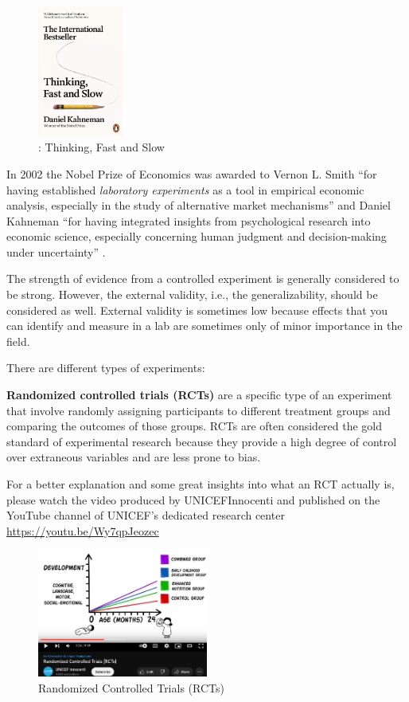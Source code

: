 \documentclass[
  12pt,
  oneside]{book}
\theoremstyle{definition}
\theoremstyle{definition}
\theoremstyle{definition}
\theoremstyle{definition}
\theoremstyle{remark}
\begin{document}
\begin{figure}
\centering
\includegraphics[width=0.25\textwidth,height=\textheight]{fig/tfts.jpg}
\caption{\label{fig:dkahnemann2} \citet{Kahneman2011Thinking}: Thinking, Fast and Slow}
\end{figure}

In 2002 the Nobel Prize of Economics was awarded to Vernon L. Smith ``for having established \emph{laboratory experiments} as a tool in empirical economic analysis, especially in the study of alternative market mechanisms'' \citep{RSAS2002} and Daniel Kahneman ``for having integrated insights from psychological research into economic science, especially concerning human judgment and decision-making under uncertainty'' \citep{RSAS2002}.

The strength of evidence from a controlled experiment is generally considered to be strong. However, the external validity, i.e., the generalizability, should be considered as well. External validity is sometimes low because effects that you can identify and measure in a lab are sometimes only of minor importance in the field.

There are different types of experiments:

\textbf{Randomized controlled trials (RCTs)} are a specific type of an experiment that involve randomly assigning participants to different treatment groups and comparing the outcomes of those groups. RCTs are often considered the gold standard of experimental research because they provide a high degree of control over extraneous variables and are less prone to bias.

For a better explanation and some great insights into what an RCT actually is, please watch the video produced by UNICEFInnocenti and published on the YouTube channel of UNICEF's dedicated research center \url{https://youtu.be/Wy7qpJeozec}

\begin{figure}
\centering
\includegraphics[width=0.5\textwidth,height=\textheight]{fig/rcts-video.png}
\caption{\label{fig:rcts} Randomized Controlled Trials (RCTs)}
\end{figure}
\end{document}
